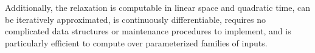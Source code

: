 \documentclass[10pt]{article}
\numberwithin{equation}{section}
\newcommand{\+}{%
	\raisebox{0.18ex}{\scaleobj{0.55}{+}}
}
\theoremstyle{definition}
\theoremstyle{definition}
\begin{document}
Additionally, the relaxation is computable in linear space and quadratic time, can be iteratively approximated, is continuously differentiable, requires no complicated data structures or maintenance procedures to implement, and is particularly efficient to compute over parameterized families of inputs. 
\end{document}
